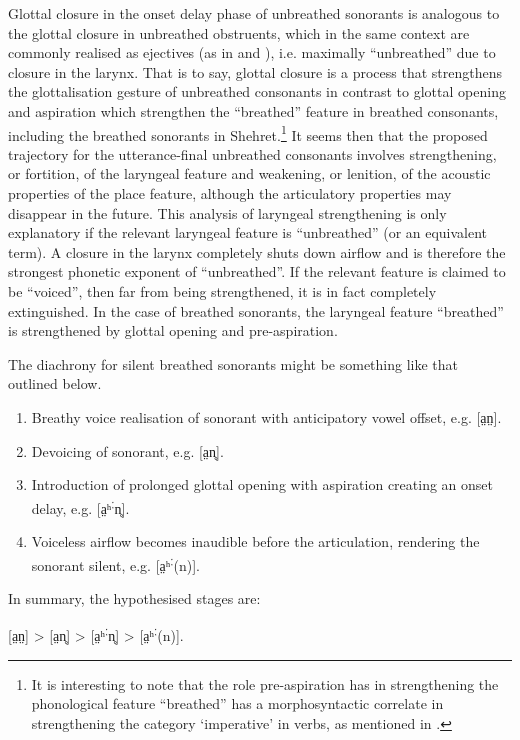 \documentclass[output=paper]{langscibook}
\begin{document}
Glottal closure in the onset delay phase of unbreathed sonorants is analogous to the glottal closure in unbreathed obstruents, which in the same context are commonly realised as ejectives (as in  and ), i.e. maximally ``unbreathed'' due to closure in the larynx. That is to say, glottal closure is a process that strengthens the glottalisation gesture of unbreathed consonants in contrast to glottal opening and aspiration which strengthen the ``breathed'' feature in breathed consonants, including the breathed sonorants in Shehret.\footnote{It is interesting to note that the role pre-aspiration has in strengthening the phonological feature ``breathed'' has a morphosyntactic correlate in strengthening the category ‘imperative’ in verbs, as
mentioned in .}  It seems then that the proposed trajectory for the utterance-final unbreathed consonants involves strengthening, or fortition, of the laryngeal feature and weakening, or lenition, of the acoustic properties of the place feature, although the articulatory properties may disappear in the future. This analysis of laryngeal strengthening is only explanatory if the relevant laryngeal feature is ``unbreathed'' (or an equivalent term). A closure in the larynx completely shuts down airflow and is therefore the strongest phonetic exponent of ``unbreathed''. If the relevant feature is claimed to be ``voiced'', then far from being strengthened, it is in fact completely extinguished. In the case of breathed sonorants, the laryngeal feature ``breathed'' is strengthened by glottal opening and pre-aspiration.

The diachrony for silent breathed sonorants might be something like that outlined below.

\begin{enumerate}
\item Breathy voice realisation of sonorant with anticipatory vowel offset, e.g. [a̤n̤].
\item Devoicing of sonorant, e.g. [a̤n̥].
\item Introduction of prolonged glottal opening with aspiration creating an onset delay, e.g. [a̤ʰ\textsuperscript{ː}n̥].
\item Voiceless airflow becomes inaudible before the articulation, rendering the sonorant silent, e.g. [a̤ʰ\textsuperscript{ː}(n)].
\end{enumerate}
 In summary, the hypothesised stages are:

 \ea{}
          [a̤n̤] > [a̤n̥] > [a̤ʰ\textsuperscript{ː}n̥] > [a̤ʰ\textsuperscript{ː}(n)].
\z
\end{document}
